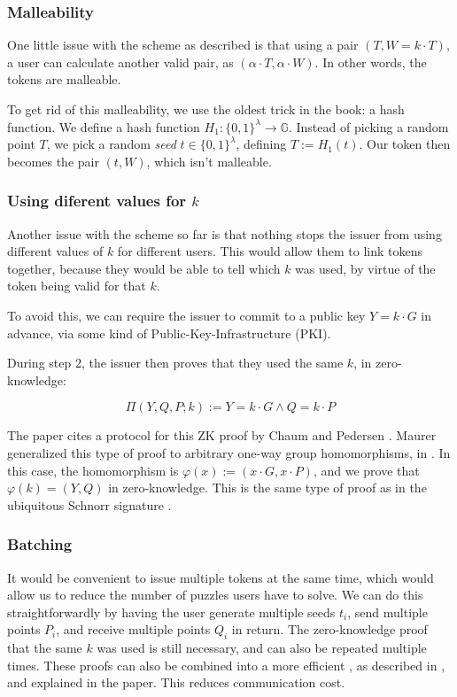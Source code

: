 \documentclass[9pt, a4paper]{article}
\begin{document}
\subsubsection{Malleability}

One little issue with the scheme as described is that using
a pair $(T, W = k \cdot T)$, a user can calculate another valid pair,
as $(\alpha \cdot T, \alpha \cdot W)$. In other words, the tokens
are malleable.

To get rid of this malleability, we use the oldest trick in the book:
a hash function. We define a hash function $H_1 : \{0, 1\}^\lambda \to \mathbb{G}$.
Instead of picking a random point $T$, we pick a random \textit{seed}
$t \in \{0, 1\}^\lambda$, defining $T := H_1(t)$. Our token then
becomes the pair $(t, W)$, which isn't malleable.

\subsubsection{Using diferent values for $k$}

Another issue with the scheme so far is that nothing stops the issuer
from using different values of $k$ for different users. This would
allow them to link tokens together, because they would be able to tell
which $k$ was used, by virtue of the token being valid for that $k$.

To avoid this, we can require the issuer to commit to a public key
$Y = k \cdot G$ in advance, via some kind of Public-Key-Infrastructure (PKI).

During step 2, the issuer then proves that they used the same $k$, in zero-knowledge:

$$
\Pi(Y, Q, P ; k) := Y = k \cdot G \land Q = k \cdot P
$$

The paper cites a protocol for this ZK proof by Chaum and Pedersen
\cite{chaum_wallet_92}. Maurer generalized this type of proof
to arbitrary one-way group homomorphisms, in \cite{maurer_2009}.
In this case, the homomorphism is $\varphi(x) := (x \cdot G, x \cdot P)$,
and we prove that $\varphi(k) = (Y, Q)$ in zero-knowledge. This is
the same type of proof as in the ubiquitous Schnorr signature \cite{schnorr_1990}.

\subsubsection{Batching}

It would be convenient to issue multiple tokens at the same time,
which would allow us to reduce the number of puzzles users have to solve.
We can do this straightforwardly by having the user generate
multiple seeds $t_i$, send multiple points $P_i$, and receive multiple points
$Q_i$ in return. The zero-knowledge proof that the same $k$ was used
is still necessary, and can also be repeated multiple times. These
proofs can also be combined into a more efficient ,
as described in \cite{henry_13}, and explained in the paper. This reduces
communication cost.
\end{document}
